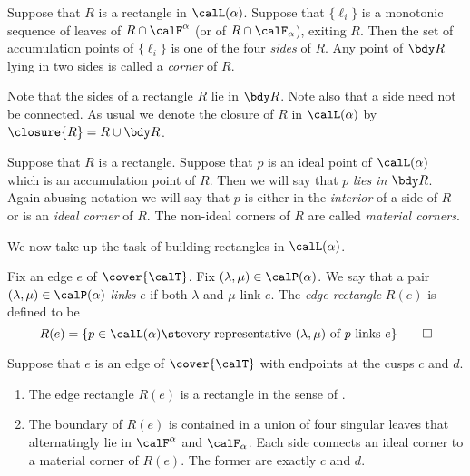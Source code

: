 \documentclass[12pt]{amsart}
\begin{document}
\begin{definition}
\label{Def:Boundary}
Suppose that $R$ is a rectangle in $\calL(\alpha)$.  Suppose that $\{\ell_i\}$ is a monotonic sequence of leaves of $R \cap \calF^\alpha$ (or of $R \cap \calF_\alpha$), exiting $R$.  Then the set of accumulation points of $\{\ell_i\}$ is one of the four \emph{sides} of $R$.  Any point of $\bdy R$ lying in two sides is called a \emph{corner} of $R$.  
\end{definition}

Note that the sides of a rectangle $R$ lie in $\bdy R$.  Note also that a side need not be connected.  As usual we denote the closure of $R$ in $\calL(\alpha)$ by $\closure{R} = R \cup \bdy R$.  

Suppose that $R$ is a rectangle.  Suppose that $p$ is an ideal point of $\calL(\alpha)$ which is an accumulation point of $R$.  Then we will say that $p$ \emph{lies in} $\bdy R$.  Again abusing notation we will say that $p$ is either in the \emph{interior} of a side of $R$ or is an \emph{ideal corner} of $R$.  The non-ideal corners of $R$ are called \emph{material corners}. 

We now take up the task of building rectangles in $\calL(\alpha)$. 

\begin{definition}
\label{Def:EdgeRectangle}
Fix an edge $e$ of $\cover{\calT}$.  Fix $(\lambda, \mu) \in \calP(\alpha)$.  We say that a pair $(\lambda, \mu) \in \calP(\alpha)$ \emph{links} $e$ if both $\lambda$ and $\mu$ link $e$.  The \emph{edge rectangle} $R(e)$ is defined to be
\[
R(e) = \{ p \in \calL(\alpha) \st \mbox{every representative $(\lambda,\mu)$ of $p$ links $e$} \} \qedhere
\]
\end{definition}

\begin{lemma}
\label{Lem:EdgeRectangle}
Suppose that $e$ is an edge of $\cover{\calT}$ with endpoints at the cusps $c$ and $d$.
\begin{enumerate}
\item
\label{Itm:EdgeRectRect}
The edge rectangle $R(e)$ is a rectangle in the sense of .
\item
\label{Itm:EdgeRectBdy}
The boundary of $R(e)$ is contained in a union of four singular leaves that alternatingly lie in $\calF^\alpha$ and $\calF_\alpha$.  Each side connects an ideal corner to a material corner of $R(e)$.  The former are exactly $c$ and $d$. 
\end{enumerate}
\end{lemma}
\end{document}
